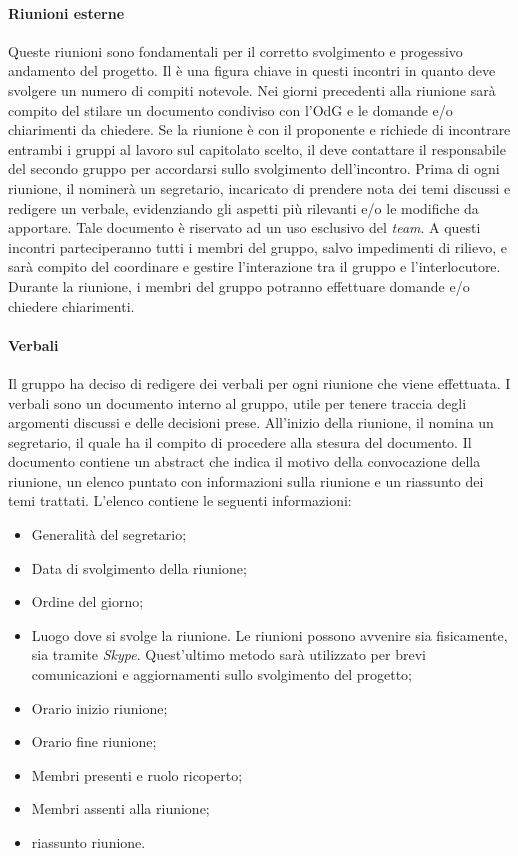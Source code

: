 			\paragraph{Riunioni esterne}
			Queste riunioni sono fondamentali per il corretto svolgimento e progessivo andamento del progetto.
			Il \textit{\RdP} è una figura chiave in questi incontri in quanto deve svolgere un numero di compiti notevole.
			Nei giorni precedenti alla riunione sarà compito del \textit{\RdP} stilare un documento condiviso con l'OdG e le domande e/o chiarimenti da chiedere. Se la riunione è con il proponente e richiede di incontrare entrambi i gruppi al lavoro sul capitolato scelto, il \textit{\RdP} deve contattare il responsabile del secondo gruppo per accordarsi sullo svolgimento dell'incontro. Prima di ogni riunione, il \textit{\RdP} nominerà un segretario, incaricato di prendere nota dei temi discussi e redigere un verbale, evidenziando gli aspetti più rilevanti e/o le modifiche da apportare. Tale documento è riservato ad un uso esclusivo del \textit{team}.
			A questi incontri parteciperanno tutti i membri del gruppo, salvo impedimenti di rilievo, e sarà compito del \textit{\RdP} coordinare e gestire l’interazione tra il gruppo e l’interlocutore. Durante la riunione, i membri del gruppo potranno effettuare domande e/o chiedere chiarimenti. 
			
			\paragraph{Verbali}
			Il gruppo ha deciso di redigere dei verbali per ogni riunione che viene effettuata. I verbali sono un documento interno al gruppo, utile per tenere traccia degli argomenti discussi e delle decisioni prese. All'inizio della riunione, il \textit{\RdP} nomina un segretario, il quale ha il compito di procedere alla stesura del documento. Il documento contiene un abstract che indica il motivo della convocazione della riunione, un elenco puntato con informazioni sulla riunione e un riassunto dei temi trattati. L'elenco contiene le seguenti informazioni:
			\begin{itemize}
				\item Generalità del segretario;
				\item Data di svolgimento della riunione;
				\item Ordine del giorno;
				\item Luogo dove si svolge la riunione. Le riunioni possono avvenire sia fisicamente, sia tramite \textit{Skype}. Quest'ultimo metodo sarà utilizzato per brevi comunicazioni e aggiornamenti sullo svolgimento del progetto;
				\item Orario inizio riunione;
				\item Orario fine riunione;
				\item Membri presenti e ruolo ricoperto;
				\item Membri assenti alla riunione;
				\item riassunto riunione.
			\end{itemize}

